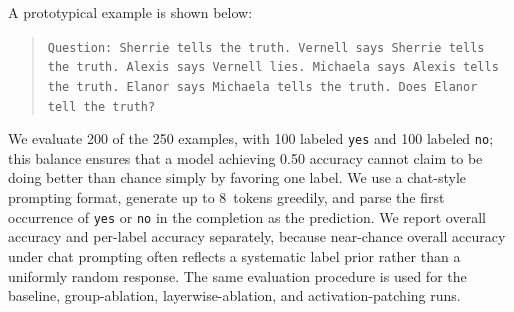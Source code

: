 \documentclass{article}
\begin{document}
A prototypical example is shown below:
\begin{quote}
\small
\texttt{Question: Sherrie tells the truth. Vernell says Sherrie tells the truth. Alexis says Vernell lies. Michaela says Alexis tells the truth. Elanor says Michaela tells the truth. Does Elanor tell the truth?}
\end{quote}

We evaluate 200 of the 250 examples, with 100 labeled \texttt{yes} and 100 labeled \texttt{no}; this balance ensures that a model achieving 0.50 accuracy cannot claim to be doing better than chance simply by favoring one label. We use a chat-style prompting format, generate up to 8~tokens greedily, and parse the first occurrence of \texttt{yes} or \texttt{no} in the completion as the prediction. We report overall accuracy and per-label accuracy separately, because near-chance overall accuracy under chat prompting often reflects a systematic label prior rather than a uniformly random response. The same evaluation procedure is used for the baseline, group-ablation, layerwise-ablation, and activation-patching runs.



\end{document}
